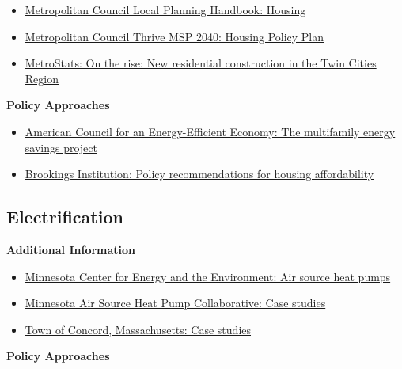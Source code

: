\documentclass[
]{book}
\providecommand{\tightlist}{%
  \setlength{\itemsep}{0pt}\setlength{\parskip}{0pt}}
\begin{document}
\begin{itemize}
\tightlist
\item
  \href{https://metrocouncil.org/Handbook/Plan-Elements/Housing.aspx}{Metropolitan Council Local Planning Handbook: Housing}
\item
  \href{https://metrocouncil.org/Housing/Planning/HOUSING-POLICY-PLAN-2040/2040-Housing-Policy-Plan.aspx}{Metropolitan Council Thrive MSP 2040: Housing Policy Plan}
\item
  \href{https://metrocouncil.org/Data-and-Maps/Publications-And-Resources/MetroStats/Construction-Activity/On-the-Rise-New-Residential-Construction-in-the-T.aspx}{MetroStats: On the rise: New residential construction in the Twin Cities Region}
\end{itemize}

\textbf{Policy Approaches}

\begin{itemize}
\tightlist
\item
  \href{https://www.aceee.org/multifamily-project}{American Council for an Energy-Efficient Economy: The multifamily energy savings project}
\item
  \href{https://www.brookings.edu/policy2020/bigideas/to-improve-housing-affordability-we-need-better-alignment-of-zoning-taxes-and-subsidies/}{Brookings Institution: Policy recommendations for housing affordability}
\end{itemize}

\hypertarget{electrification}{%
\subsection{Electrification}\label{electrification}}

\textbf{Additional Information}

\begin{itemize}
\tightlist
\item
  \href{https://www.mncee.org/air-source-heat-pumps}{Minnesota Center for Energy and the Environment: Air source heat pumps}
\item
  \href{https://www.mnashp.org/for-homeowners}{Minnesota Air Source Heat Pump Collaborative: Case studies}
\item
  \href{https://concordma.gov/2776/Heat-Pump-Case-Studies}{Town of Concord, Massachusetts: Case studies}
\end{itemize}

\textbf{Policy Approaches}
\end{document}
